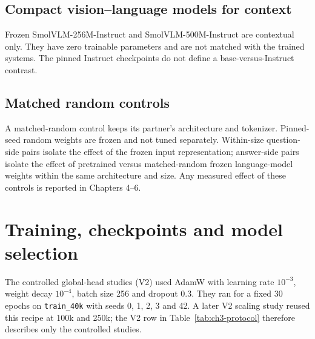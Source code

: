 \subsection{Compact vision--language models for context}
Frozen SmolVLM-256M-Instruct and SmolVLM-500M-Instruct \citep{marafioti2025smolvlm} are contextual only. They have zero trainable parameters and are not matched with the trained systems. The pinned Instruct checkpoints do not define a base-versus-Instruct contrast.

\subsection{Matched random controls}
A matched-random control keeps its partner's architecture and tokenizer. Pinned-seed random weights are frozen and not tuned separately. Within-size question-side pairs isolate the effect of the frozen input representation; answer-side pairs isolate the effect of pretrained versus matched-random frozen language-model weights within the same architecture and size. Any measured effect of these controls is reported in Chapters 4--6.

\begin{table}[p]
\centering
\caption[Trainable-parameter accounting by architecture family.]{Trainable parameters by architecture. Loaded and resident-frozen totals are omitted. The shared natural-width row covers separately executed \texttt{product\_natural} and \texttt{difference\_natural} systems, with 838,244 parameters each.}
\label{tab:ch3-architectures}
\begingroup
\scriptsize
\setlength{\tabcolsep}{2.2pt}
\renewenvironment{longtable}[1]
  {\begin{tabular}{|p{0.17\textwidth}|p{0.25\textwidth}|p{0.35\textwidth}|p{0.14\textwidth}|}}
  {\end{tabular}}
\let\endhead\relax

\endgroup
\end{table}

\section{Training, checkpoints and model selection}
\label{sec:ch3-training}
The controlled global-head studies (V2) used AdamW with learning rate
$10^{-3}$, weight decay $10^{-4}$, batch size 256 and dropout 0.3. They ran
for a fixed 30 epochs on \texttt{train\_40k} with seeds 0, 1, 2, 3 and 42.
A later V2 scaling study reused this recipe at 100k and 250k; the V2 row in
Table~\ref{tab:ch3-protocol} therefore describes only the controlled studies.

